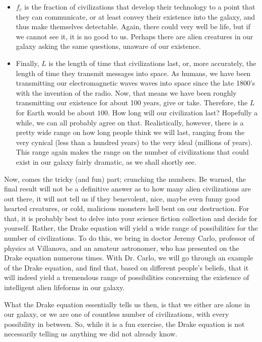 \documentclass[12pt,twoside]{book}
\begin{document}
\begin{itemize}
	\item $f_c$ is the fraction of civilizations that develop their technology to a point that they can communicate, or at least convey their existence into the galaxy, and thus make themselves detectable.  Again, there could very well be life, but if we cannot see it, it is no good to us.  Perhaps there are alien creatures in our galaxy asking the same questions, unaware of our existence.
	\item Finally, $L$ is the length of time that civilizations last, or, more accurately, the length of time they transmit messages into space.  As humans, we have been transmitting our electromagnetic waves\cite{eandm} waves into space since the late 1800's with the invention of the radio.  Now, that means we have been roughly transmitting our existence for about 100 years, give or take.  Therefore, the $L$ for Earth would be about $100$. How long will our civilization last?  Hopefully a while, we can all probably agree on that. Realistically, however, there is a pretty wide range on how long people think we will last, ranging from the very cynical (less than a hundred years) to the very ideal (millions of years). This range again makes the range on the number of civilizations that could exist in our galaxy fairly dramatic, as we shall shortly see.	
	\end{itemize} 
	
	Now, comes the tricky (and fun) part; crunching the numbers.  Be warned, the final result will not be a definitive answer as to how many alien civilizations are out there, it will not tell us if they benevolent, nice, maybe even funny good hearted creatures, or cold, malicious monsters hell bent on our destruction.  For that, it is probably best to delve into your science fiction collection and decide for yourself.  Rather, the Drake equation will yield a wide range of possibilities for the number of civilizations.  To do this, we bring in doctor Jeremy Carlo, professor of physics at Villanova, and an amateur astronomer, who has presented on the Drake equation numerous times. With Dr. Carlo, we will go through an example of the Drake equation, and find that, based on different people's beliefs, that it will indeed yield a tremendous range of possibilities concerning the existence of intelligent alien lifeforms in our galaxy.
	
	What the Drake equation essentially tells us then, is that we either are alone in our galaxy, or we are one of countless number of civilizations, with every possibility in between.  So, while it is a fun exercise, the Drake equation is not necessarily telling us anything we did not already know.
\end{document}
